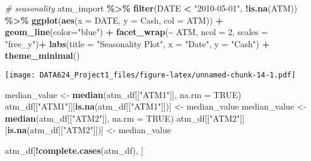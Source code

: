 \documentclass[
]{article}
\newenvironment{Shaded}{\begin{snugshade}}{\end{snugshade}}
\newcommand{\AttributeTok}[1]{\textcolor[rgb]{0.13,0.29,0.53}{#1}}
\newcommand{\CommentTok}[1]{\textcolor[rgb]{0.56,0.35,0.01}{\textit{#1}}}
\newcommand{\ConstantTok}[1]{\textcolor[rgb]{0.56,0.35,0.01}{#1}}
\newcommand{\DecValTok}[1]{\textcolor[rgb]{0.00,0.00,0.81}{#1}}
\newcommand{\FunctionTok}[1]{\textcolor[rgb]{0.13,0.29,0.53}{\textbf{#1}}}
\newcommand{\NormalTok}[1]{#1}
\newcommand{\OtherTok}[1]{\textcolor[rgb]{0.56,0.35,0.01}{#1}}
\newcommand{\SpecialCharTok}[1]{\textcolor[rgb]{0.81,0.36,0.00}{\textbf{#1}}}
\newcommand{\StringTok}[1]{\textcolor[rgb]{0.31,0.60,0.02}{#1}}
\begin{document}
\begin{Shaded}
\begin{Highlighting}[]
\CommentTok{\# seasonality}
\NormalTok{atm\_import }\SpecialCharTok{\%\textgreater{}\%} 
  \FunctionTok{filter}\NormalTok{(DATE }\SpecialCharTok{\textless{}} \StringTok{"2010{-}05{-}01"}\NormalTok{, }\SpecialCharTok{!}\FunctionTok{is.na}\NormalTok{(ATM)) }\SpecialCharTok{\%\textgreater{}\%} 
  \FunctionTok{ggplot}\NormalTok{(}\FunctionTok{aes}\NormalTok{(}\AttributeTok{x =}\NormalTok{ DATE, }\AttributeTok{y =}\NormalTok{ Cash, }\AttributeTok{col =}\NormalTok{ ATM)) }\SpecialCharTok{+}
    \FunctionTok{geom\_line}\NormalTok{(}\AttributeTok{color=}\StringTok{"blue"}\NormalTok{) }\SpecialCharTok{+}
    \FunctionTok{facet\_wrap}\NormalTok{(}\SpecialCharTok{\textasciitilde{}}\NormalTok{ ATM, }\AttributeTok{ncol =} \DecValTok{2}\NormalTok{, }\AttributeTok{scales =} \StringTok{"free\_y"}\NormalTok{)}\SpecialCharTok{+}
  \FunctionTok{labs}\NormalTok{(}\AttributeTok{title =} \StringTok{"Seasonality Plot"}\NormalTok{, }\AttributeTok{x =} \StringTok{"Date"}\NormalTok{, }\AttributeTok{y =} \StringTok{"Cash"}\NormalTok{) }\SpecialCharTok{+}
    \FunctionTok{theme\_minimal}\NormalTok{()}
\end{Highlighting}
\end{Shaded}

\texttt{[image: DATA624\_Project1\_files/figure-latex/unnamed-chunk-14-1.pdf]}

\begin{Shaded}
\begin{Highlighting}[]
\NormalTok{median\_value }\OtherTok{\textless{}{-}} \FunctionTok{median}\NormalTok{(atm\_df[[}\StringTok{"ATM1"}\NormalTok{]], }\AttributeTok{na.rm =} \ConstantTok{TRUE}\NormalTok{)}
\NormalTok{atm\_df[[}\StringTok{"ATM1"}\NormalTok{]][}\FunctionTok{is.na}\NormalTok{(atm\_df[[}\StringTok{"ATM1"}\NormalTok{]])] }\OtherTok{\textless{}{-}}\NormalTok{ median\_value}
\NormalTok{median\_value }\OtherTok{\textless{}{-}} \FunctionTok{median}\NormalTok{(atm\_df[[}\StringTok{"ATM2"}\NormalTok{]], }\AttributeTok{na.rm =} \ConstantTok{TRUE}\NormalTok{)}
\NormalTok{atm\_df[[}\StringTok{"ATM2"}\NormalTok{]][}\FunctionTok{is.na}\NormalTok{(atm\_df[[}\StringTok{"ATM2"}\NormalTok{]])] }\OtherTok{\textless{}{-}}\NormalTok{ median\_value}
\end{Highlighting}
\end{Shaded}

\begin{Shaded}
\begin{Highlighting}[]
\NormalTok{atm\_df[}\SpecialCharTok{!}\FunctionTok{complete.cases}\NormalTok{(atm\_df), ]}
\end{Highlighting}
\end{Shaded}
\end{document}
